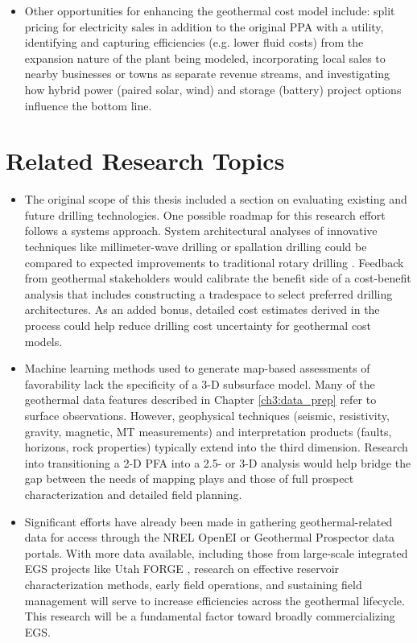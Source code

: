 \begin{itemize}
    \item Other opportunities for enhancing the geothermal cost model include: split pricing for electricity sales in addition to the original PPA with a utility, identifying and capturing efficiencies (e.g. lower fluid costs) from the expansion nature of the plant being modeled, incorporating local sales to nearby businesses or towns as separate revenue streams, and investigating how hybrid power (paired solar, wind) and storage (battery) project options influence the bottom line.
\end{itemize}

\section{Related Research Topics}\label{ch9:future_work_related}

\begin{itemize}
    \item The original scope of this thesis included a section on evaluating existing and future drilling technologies. One possible roadmap for this research effort follows a systems approach. System architectural analyses of innovative techniques like millimeter-wave drilling \citep{woskov_millimeter-wave_2017} or spallation drilling \cite{augustine_hydrothermal_2009} could be compared to expected improvements to traditional rotary drilling \citep{lowry_geovision_2017}. Feedback from geothermal stakeholders would calibrate the benefit side of a cost-benefit analysis that includes constructing a tradespace to select preferred drilling architectures. As an added bonus, detailed cost estimates derived in the process could help reduce drilling cost uncertainty for geothermal cost models.
    \item Machine learning methods used to generate map-based assessments of favorability lack the specificity of a 3-D subsurface model. Many of the geothermal data features described in Chapter \ref{ch3:data_prep} refer to surface observations. However, geophysical techniques (seismic, resistivity, gravity, magnetic, MT measurements) and interpretation products (faults, horizons, rock properties) typically extend into the third dimension. Research into transitioning a 2-D PFA into a 2.5- or 3-D analysis would help bridge the gap between the needs of mapping plays and those of full prospect characterization and detailed field planning.
    \item Significant efforts have already been made in gathering geothermal-related data for access through the NREL OpenEI \citep{hallett_open_2010} or Geothermal Prospector \citep{nrel_geothermal_2021} data portals. With more data available, including those from large-scale integrated EGS projects like Utah FORGE \citep{moore_utah_2019}, research on effective reservoir characterization methods, early field operations, and sustaining field management will serve to increase efficiencies across the geothermal lifecycle. This research will be a fundamental factor toward broadly commercializing EGS.
\end{itemize}